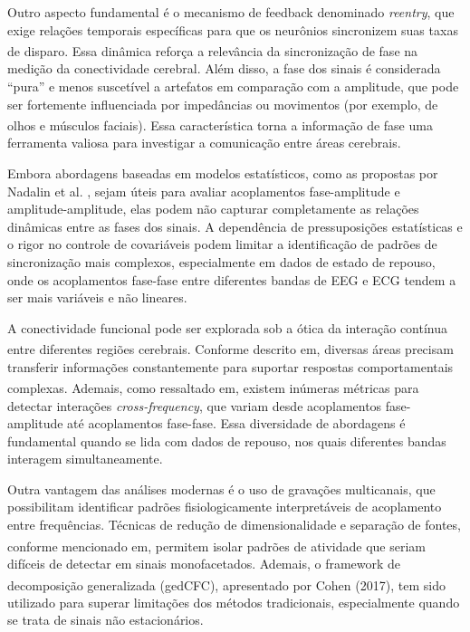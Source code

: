 Outro aspecto fundamental é o mecanismo de feedback denominado \emph{reentry}, que exige relações temporais específicas para que os neurônios sincronizem suas taxas de disparo\textsuperscript{\cite{seraj2018}}. Essa dinâmica reforça a relevância da sincronização de fase na medição da conectividade cerebral. Além disso, a fase dos sinais é considerada “pura” e menos suscetível a artefatos em comparação com a amplitude, que pode ser fortemente influenciada por impedâncias ou movimentos (por exemplo, de olhos e músculos faciais)\textsuperscript{\cite{seraj2018}}. Essa característica torna a informação de fase uma ferramenta valiosa para investigar a comunicação entre áreas cerebrais.

Embora abordagens baseadas em modelos estatísticos, como as propostas por Nadalin et al. \cite{nadalin2019statistical}, sejam úteis para avaliar acoplamentos fase-amplitude e amplitude-amplitude, elas podem não capturar completamente as relações dinâmicas entre as fases dos sinais. A dependência de pressuposições estatísticas e o rigor no controle de covariáveis podem limitar a identificação de padrões de sincronização mais complexos, especialmente em dados de estado de repouso, onde os acoplamentos fase-fase entre diferentes bandas de EEG e ECG tendem a ser mais variáveis e não lineares.

A conectividade funcional pode ser explorada sob a ótica da interação contínua entre diferentes regiões cerebrais. Conforme descrito em\textsuperscript{\cite{sorrentino2022}}, diversas áreas precisam transferir informações constantemente para suportar respostas comportamentais complexas. Ademais, como ressaltado em\textsuperscript{\cite{sorrentino2022}}, existem inúmeras métricas para detectar interações \textit{cross-frequency}, que variam desde acoplamentos fase-amplitude até acoplamentos fase-fase. Essa diversidade de abordagens é fundamental quando se lida com dados de repouso, nos quais diferentes bandas interagem simultaneamente.

Outra vantagem das análises modernas é o uso de gravações multicanais, que possibilitam identificar padrões fisiologicamente interpretáveis de acoplamento entre frequências. Técnicas de redução de dimensionalidade e separação de fontes, conforme mencionado em\textsuperscript{\cite{cohen2017multivariate}}, permitem isolar padrões de atividade que seriam difíceis de detectar em sinais monofacetados. Ademais, o framework de decomposição generalizada (gedCFC), apresentado por Cohen (2017)\textsuperscript{\cite{cohen2017multivariate}}, tem sido utilizado para superar limitações dos métodos tradicionais, especialmente quando se trata de sinais não estacionários.

